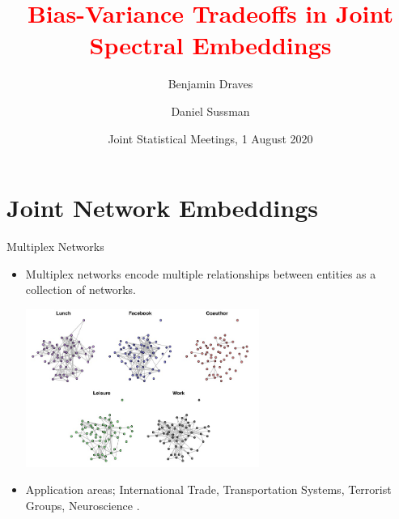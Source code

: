 \documentclass[handout]{beamer}
\title{\textcolor{red}{Bias-Variance Tradeoffs in Joint Spectral Embeddings}}
\author[Benjamin Draves]{Benjamin Draves \and Daniel Sussman}
\institute[Boston Univeristy] 
{\normalsize Boston University}
\date{Joint Statistical Meetings, 1 August 2020}
\begin{document}
\begin{frame}
  \titlepage
\end{frame}

\section{Joint Network Embeddings}

\begin{frame}{Multiplex Networks}
\begin{itemize}
    \item Multiplex networks encode multiple relationships between entities as a collection of networks. 
    \begin{center}
        \includegraphics[width=0.6\textwidth]{aarhus_multiplex.jpg}
    \end{center}\pause
    \item Application areas; International Trade, Transportation Systems, Terrorist Groups, Neuroscience \parencite{Kivela2014}. 
\end{itemize}
\end{frame}
\end{document}
